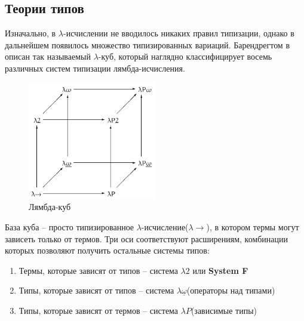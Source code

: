 \subsection{Теории типов}

Изначально, в $\lambda$-исчислении не вводилось никаких правил типизации, однако в дальнейшем появилось множество типизированных вариаций. Барендрегтом в~\cite{barendregt1993lambda} описан так называемый $\lambda$-куб, который наглядно классифицирует восемь различных систем типизации лямбда-исчисления.

\begin{figure}[H]
  \centering
  \includegraphics[width=0.5\textwidth]{img/Lambda_cube.png}
  \caption{Лямбда-куб}
\end{figure}

База куба -- просто типизированное $\lambda$-исчисление($\lambda{\to}$), в котором термы могут зависеть только от термов. Три оси соответствуют расширениям, комбинации которых позволяют получить остальные системы типов:

\begin{enumerate}
  \item Термы, которые зависят от типов -- система $\lambda2$ или \textbf{System F}
  \item Типы, которые зависят от типов -- система $\lambda \underline{\omega}$(операторы над типами)
  \item Типы, которые зависят от термов -- система $\lambda P$(зависимые типы)
\end{enumerate}
